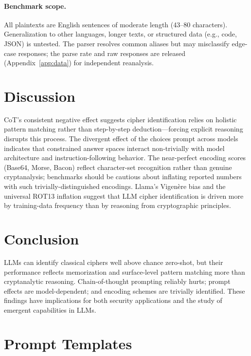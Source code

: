 \documentclass{article}
\begin{document}
\paragraph{Benchmark scope.}
All plaintexts are English sentences of moderate length (43--80 characters).
Generalization to other languages, longer texts, or structured data
(e.g., code, JSON) is untested.
The parser resolves common aliases but may misclassify edge-case responses;
the parse rate and raw responses are released (Appendix~\ref{app:data}) for
independent reanalysis.

\section{Discussion}

CoT's consistent negative effect suggests cipher identification relies on
holistic pattern matching rather than step-by-step deduction---forcing
explicit reasoning disrupts this process.
The divergent effect of the choices prompt across models indicates that
constrained answer spaces interact non-trivially with model architecture
and instruction-following behavior.
The near-perfect encoding scores (Base64, Morse, Bacon) reflect character-set
recognition rather than genuine cryptanalysis; benchmarks should be cautious
about inflating reported numbers with such trivially-distinguished encodings.
Llama's Vigen\`{e}re bias and the universal ROT13 inflation suggest that
LLM cipher identification is driven more by training-data frequency than
by reasoning from cryptographic principles.

\section{Conclusion}

LLMs can identify classical ciphers well above chance zero-shot, but their
performance reflects memorization and surface-level pattern matching more
than cryptanalytic reasoning. Chain-of-thought prompting reliably hurts;
prompt effects are model-dependent; and encoding schemes are trivially
identified. These findings have implications for both security applications
and the study of emergent capabilities in LLMs.

\appendix

\section{Prompt Templates}
\label{app:prompts}
\end{document}
